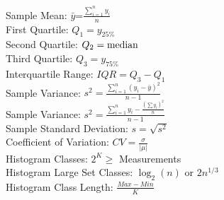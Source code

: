 \documentclass[letter, 12pt]{article}
\begin{document}
\newpage
\begin{multicols}{2}
Sample Mean: $\bar{y}$=$\frac{\sum_{i=1}^n y_i}{n}$\\
First Quartile: $Q_1=y_{25\%}$\\
Second Quartile: $Q_2=\textnormal{median}$\\
Third Quartile: $Q_3=y_{75\%}$\\
Interquartile Range: $IQR=Q_3-Q_1$\\
Sample Variance: $s^2=\frac{\sum_{i=1}^n (y_i-\bar{y})^2}{n-1}$\\
Sample Variance: $s^2=\frac{\sum_{i=1}^n y_i - \frac{(\sum y_i)^2}{n}}{n-1}$\\
Sample Standard Deviation: $s=\sqrt{s^2}$\\
Coefficient of Variation: $CV=\frac{\sigma}{\lvert\mu\rvert}$\\
Histogram Classes: $2^K \geq$ Measurements\\
Histogram Large Set Classes: $\log_2(n)$ or $2n^{1/3}$\\
Histogram Class Length: $\frac{Max-Min}{K}$
\vfill
\columnbreak
\vspace*{\fill}
\end{multicols}
\end{document}
